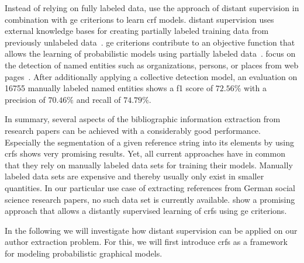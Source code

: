 \bigskip

Instead of relying on fully labeled data, \citet{lu2013web} use the approach of \gls{distant supervision} in combination with \glspl{ge criterion} to learn \gls{crf} models.
\Gls{distant supervision} uses external knowledge bases for creating partially labeled training data from previously unlabeled data~\citep{mintz2009distant}.
\Glspl{ge criterion} contribute to an objective function that allows the learning of probabilistic models using partially labeled data~\citep{mann2007simple}.
\citet{lu2013web} focus on the detection of named entities such as organizations, persons, or places from web pages~\citep{lu2013web}.
After additionally applying a collective detection model, an evaluation on \num{16755} manually labeled named entities shows a \gls{f1 score} of $72.56\%$ with a \gls{precision} of $70.46\%$ and \gls{recall} of $74.79\%$.

\bigskip

In summary, several aspects of the bibliographic information extraction from research papers can be achieved with a considerably good performance.
Especially the segmentation of a given reference string into its elements by using \glspl{crf} \citep{peng2004accurate,councill2008parscit,groza2012reference} shows very promising results.
Yet, all current approaches have in common that they rely on manually labeled data sets for training their models.
Manually labeled data sets are expensive and thereby usually only exist in smaller quantities.
In our particular use case of extracting references from German social science research papers, no such data set is currently available.
\citet{lu2013web} show a promising approach that allows a distantly supervised learning of \glspl{crf} using \glspl{ge criterion}.

\bigskip

In the following we will investigate how \gls{distant supervision} can be applied on our author extraction problem.
For this, we will first introduce \glspl{crf} as a framework for modeling \glspl{probabilistic graphical model}.

